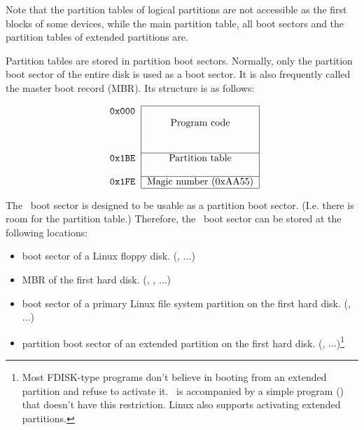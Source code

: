 Note that the partition tables of logical partitions are not accessible
as the first blocks of some devices, while the main partition table,
all boot sectors and the partition tables of extended partitions are.

Partition tables are stored in partition boot sectors. Normally, only the
partition boot sector of the entire disk is used as a boot sector. It is
also frequently called the master boot record (MBR). Its structure is as
follows:

$$
\begin{tabular}{r|c|}
  \cline{2-2}
  \tt 0x000 & \\
  & Program code \\
  & \\
  & \\
  \cline{2-2}
  \tt 0x1BE & Partition table \\
  & \\
  \cline{2-2}
  \tt 0x1FE & Magic number (0xAA55) \\
  \cline{2-2}
\end{tabular}
$$

The \LILO\ boot sector is designed to be usable as a partition boot sector.
(I.e. there is room for the partition table.)
Therefore, the \LILO\ boot sector can be stored at the following locations:

\begin{itemize}
  \item boot sector of a Linux floppy disk. (, $\ldots$)
  \item MBR of the first hard disk. (, , $\ldots$)
  \item boot sector of a primary Linux file system partition on the first hard
    disk. (, $\ldots$)
  \item partition boot sector of an extended partition on the first hard disk.
    (, $\ldots$)\footnote{Most FDISK-type programs don't
      believe in booting from an extended partition and refuse to
      activate it. \LILO\ is accompanied by a simple program
      () that doesn't have this restriction. Linux 
      also supports activating extended partitions.}
\end{itemize}

